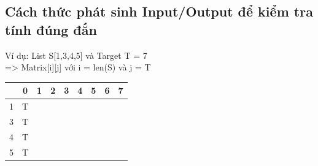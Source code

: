 \documentclass{article}
\begin{document}
    \subsection{ \fontsize{16}{16}\selectfont\textbf{Cách thức phát sinh Input/Output để kiểm tra tính đúng đắn}}
    Ví dụ: List S[1,3,4,5] và Target T = 7\\
    => Matrix[i][j] với i = len(S) và j = T
    \begin{center}
        \begin{tabular}{|c|c|c|c|c|c|c|c|c|}
        \hline
        {}&{0}&{1}&{2}&{3}&{4}&{5}&{6}&{7}\\
        \hline
        1&T&&&&&&&\\
        \hline
        3&T&&&&&&&\\
        \hline
        4&T&&&&&&&\\
        \hline
        5&T&&&&&&&\\
        \hline
    \end{tabular}
    \end{center}
    
\end{document}

